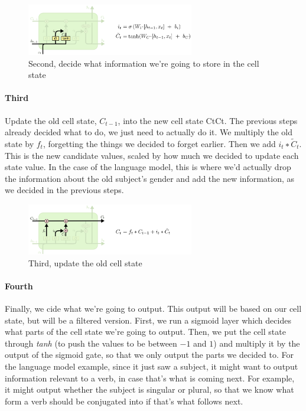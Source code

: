 \begin{figure}[h]
  \centering
  \includegraphics[width=0.65\textwidth]{Images/recurrent_neural_networks/21.png}
  \caption{Second, decide what information we’re going to store in the cell state}
\end{figure}

\paragraph*{Third} Update the old cell state, $C_{t−1}$, into the new cell state CtCt. The previous steps already decided what to do, we just need to actually do it. We multiply the old state by $f_t$, forgetting the things we decided to forget earlier. Then we add $i_t∗\widetilde{C}_t$. This is the new candidate values, scaled by how much we decided to update each state value. In the case of the language model, this is where we’d actually drop the information about the old subject’s gender and add the new information, as we decided in the previous steps.

\begin{figure}[h]
  \centering
  \includegraphics[width=0.65\textwidth]{Images/recurrent_neural_networks/22.png}
  \caption{Third, update the old cell state}
\end{figure}

\paragraph*{Fourth} Finally, we cide what we’re going to output. This output will be based on our cell state, but will be a filtered version. First, we run a sigmoid layer which decides what parts of the cell state we’re going to output. Then, we put the cell state through \textit{tanh} (to push the values to be between $−1$ and $1$) and multiply it by the output of the sigmoid gate, so that we only output the parts we decided to. For the language model example, since it just saw a subject, it might want to output information relevant to a verb, in case that’s what is coming next. For example, it might output whether the subject is singular or plural, so that we know what form a verb should be conjugated into if that’s what follows next.

